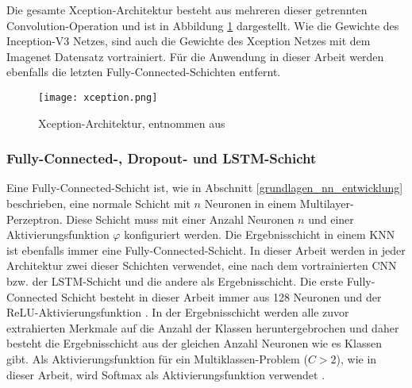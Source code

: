 Die gesamte Xception-Architektur besteht aus mehreren dieser getrennten Convolution-Operation und ist in Abbildung \ref{fig_xception} dargestellt. Wie die Gewichte des Inception-V3 Netzes, sind auch die Gewichte des Xception Netzes mit dem Imagenet Datensatz vortrainiert. Für die Anwendung in dieser Arbeit werden ebenfalls die letzten Fully-Connected-Schichten entfernt.

\begin{figure}[h]
\centering
\texttt{[image: xception.png]}
\caption{Xception-Architektur, entnommen aus \cite{chollet2017xception}}
\label{fig_xception}
\end{figure}

\subsubsection{Fully-Connected-, Dropout- und \ac{LSTM}-Schicht}

Eine Fully-Connected-Schicht ist, wie in Abschnitt \ref{grundlagen_nn_entwicklung} beschrieben, eine normale Schicht mit $n$ Neuronen in einem Multilayer-Perzeptron. Diese Schicht muss mit einer Anzahl  Neuronen $n$ und einer Aktivierungsfunktion $\varphi$ konfiguriert werden. Die Ergebnisschicht in einem \ac{KNN} ist ebenfalls immer eine Fully-Connected-Schicht. In dieser Arbeit werden in jeder Architektur zwei dieser Schichten verwendet, eine nach dem vortrainierten \ac{CNN} bzw. der \ac{LSTM}-Schicht und die andere als Ergebnisschicht. Die erste Fully-Connected Schicht besteht in dieser Arbeit immer aus 128 Neuronen und der \ac{ReLU}-Aktivierungsfunktion \cite{nair2010rectified}. In der Ergebnisschicht werden alle zuvor extrahierten Merkmale auf die Anzahl der Klassen heruntergebrochen und daher besteht die Ergebnisschicht aus der gleichen Anzahl Neuronen wie es Klassen gibt. Als Aktivierungsfunktion für ein Multiklassen-Problem ($C>2$), wie in dieser Arbeit, wird Softmax als Aktivierungsfunktion verwendet \cite{bishop2006pattern}.


